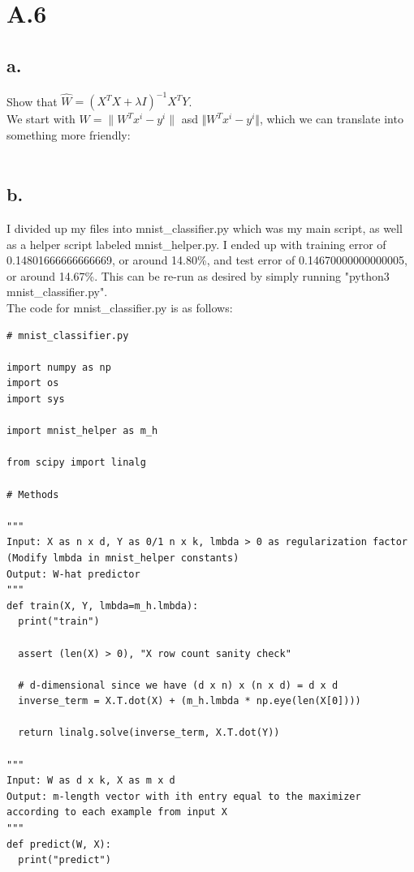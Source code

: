 \documentclass{article}
\newcommand{\1}{\mathbf{1}}
\begin{document}
{\newpage

}

\section*{A.6}
{\Large 

\subsection*{a.}

Show that $\widehat{W} = (X^TX + \lambda I)^{-1}X^TY$. \\ 
We start with $W = \| W^Tx^i - y^i \|$ asd $\Vert W^Tx^i - y^i \Vert$, which we can translate into something more friendly: \\ \\ 

\subsection*{b.}

I divided up my files into mnist\_classifier.py which was my main script, as well as a helper script labeled mnist\_helper.py. I ended up with training error of 0.14801666666666669, or around 14.80\%, and test error of 0.14670000000000005, or around 14.67\%. This can be re-run as desired by simply running "python3 mnist\_classifier.py". \\
The code for mnist\_classifier.py is as follows: \\

\begin{verbatim}
# mnist_classifier.py

import numpy as np
import os
import sys

import mnist_helper as m_h

from scipy import linalg

# Methods

"""
Input: X as n x d, Y as 0/1 n x k, lmbda > 0 as regularization factor
(Modify lmbda in mnist_helper constants)
Output: W-hat predictor
"""
def train(X, Y, lmbda=m_h.lmbda):
  print("train")

  assert (len(X) > 0), "X row count sanity check"

  # d-dimensional since we have (d x n) x (n x d) = d x d
  inverse_term = X.T.dot(X) + (m_h.lmbda * np.eye(len(X[0])))

  return linalg.solve(inverse_term, X.T.dot(Y))

"""
Input: W as d x k, X as m x d
Output: m-length vector with ith entry equal to the maximizer
according to each example from input X
"""
def predict(W, X):
  print("predict")


\end{verbatim}}
\end{document}
